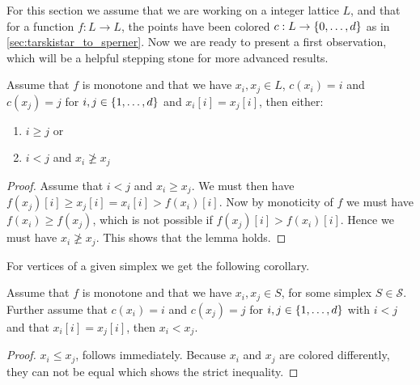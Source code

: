 For this section we assume that we are working on a integer lattice $L$, and that for a function $f : L \rightarrow L$, the points have been colored $c : L \rightarrow \left\{0, \dots, d\right\}$ as in \cref{sec:tarskistar_to_sperner}. Now we are ready to present a first observation, which will be a helpful stepping stone for more advanced results.

\begin{lemma}
    \label{lem:monotone_coloring}
    Assume that $f$ is monotone and that we have $x_i, x_j \in L$, $c(x_i) = i$ and $c(x_j) = j$ for $i, j \in \left\{1, \dots, d\right\}$ and $x_i[i] = x_j[i]$, then either:
    \begin{enumerate}
        \item $i \geq j$ or
        \item $i < j$  and $x_i \not\geq x_j$
    \end{enumerate}
\end{lemma}
\begin{proof}
    Assume that $i < j$ and $x_i \geq x_j$. We must then have $f(x_j)[i] \geq x_j[i] = x_i[i] > f(x_i)[i]$. Now by monoticity of $f$ we must have $f(x_i) \geq f(x_j)$, which is not possible if $f(x_j)[i] > f(x_i)[i]$. Hence we must have $x_i \not\geq x_j$. This shows that the lemma holds.
\end{proof}

For vertices of a given simplex we get the following corollary.
\begin{corollary}
    \label{cor:monotone_coloring}
    Assume that $f$ is monotone and that we have $x_i, x_j \in S$, for some simplex $S\in  \mathcal{S}$. Further assume that $c(x_i) = i$ and $c(x_j) = j$ for $i, j \in \left\{1, \dots, d\right\}$ with $i < j$ and that $x_i[i] = x_j[i]$, then $x_i < x_j$.
\end{corollary}
\begin{proof}
    $x_i \leq x_j$, follows immediately. Because $x_i$ and $x_j$ are colored differently, they can not be equal which shows the strict inequality.
\end{proof}
